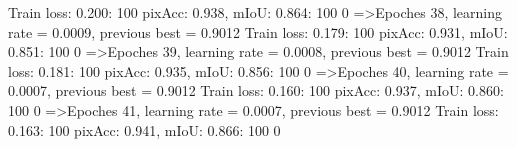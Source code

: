 Train loss: 0.200: 100%
pixAcc: 0.938, mIoU: 0.864: 100%
  0%
=>Epoches 38, learning rate = 0.0009,                 previous best = 0.9012
Train loss: 0.179: 100%
pixAcc: 0.931, mIoU: 0.851: 100%
  0%
=>Epoches 39, learning rate = 0.0008,                 previous best = 0.9012
Train loss: 0.181: 100%
pixAcc: 0.935, mIoU: 0.856: 100%
  0%
=>Epoches 40, learning rate = 0.0007,                 previous best = 0.9012
Train loss: 0.160: 100%
pixAcc: 0.937, mIoU: 0.860: 100%
  0%
=>Epoches 41, learning rate = 0.0007,                 previous best = 0.9012
Train loss: 0.163: 100%
pixAcc: 0.941, mIoU: 0.866: 100%
  0%

